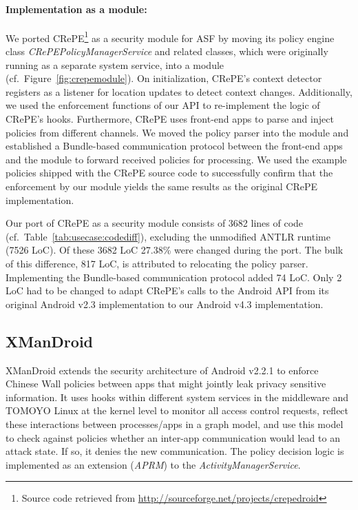 \documentclass[letterpaper,twocolumn,10pt]{article}
\newcommand{\OURSHORT}{\textsc{ASF}\xspace}
\begin{document}
\paragraph{Implementation as a module:} We ported CRePE\footnote{Source code retrieved from \url{http://sourceforge.net/projects/crepedroid}} as a security module for \OURSHORT by moving its policy engine class \textit{CRePEPolicyManagerService} and related classes, which were originally running as a separate system service, into a module (cf.~Figure~\ref{fig:crepemodule}). On initialization, CRePE's context detector registers as a listener for location updates to detect context changes. Additionally, we used the enforcement functions of our API to re-implement the logic of CRePE's hooks. Furthermore, CRePE uses front-end apps to parse and inject policies from different channels. We moved the policy parser into the module and established a Bundle-based communication protocol between the front-end apps and the module to forward received policies for processing. We used the example policies shipped with the CRePE source code to successfully confirm that the enforcement by our module yields the same results as the original CRePE implementation.

Our port of CRePE as a security module consists of 3682 lines of code (cf.~Table~\ref{tab:usecase:codediff}), excluding the unmodified ANTLR runtime (7526 LoC). Of these 3682 LoC 27.38\% were changed during the port. The bulk of this difference, 817 LoC, is attributed to relocating the policy parser. Implementing the Bundle-based communication protocol added 74 LoC. Only 2 LoC had to be changed to adapt CRePE's calls to the Android API from its original Android v2.3 implementation to our Android v4.3 implementation.


\subsection{XManDroid~\cite{BuDaDm_12:TowardsT}}
\label{sec:usecase:xmandroid}

XManDroid extends the security architecture of Android v2.2.1 to enforce Chinese Wall policies between apps that might jointly leak privacy sensitive information. It uses hooks within different system services in the middleware and TOMOYO Linux at the kernel level to monitor all access control requests, reflect these interactions between processes/apps in a graph model, and use this model to check against policies whether an inter-app communication would lead to an attack state. If so, it denies the new communication. The policy decision logic is implemented as an extension (\textit{APRM}) to the \textit{ActivityManagerService}.
\end{document}
